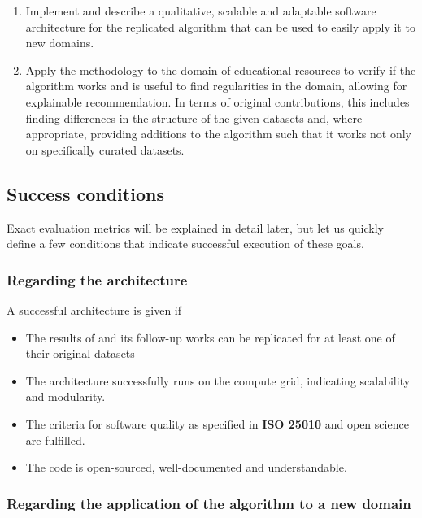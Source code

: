\begin{enumerate}
    \item Implement and describe a qualitative, scalable and adaptable software architecture for the replicated algorithm that can be used to easily apply it to new domains.
    \item Apply the methodology to the domain of educational resources to verify if the algorithm works and is useful to find regularities in the domain, allowing for explainable recommendation. In terms of original contributions, this includes finding differences in the structure of the given datasets and, where appropriate, providing additions to the algorithm such that it works not only on specifically curated datasets.
\end{enumerate}

\subsection{Success conditions}
\label{sec:success_conds}

Exact evaluation metrics will be explained in detail later, but let us quickly define a few conditions that indicate successful execution of these goals.

\subsubsection*{Regarding the architecture}

A successful architecture is given if 

\begin{itemize}
    \item The results of \cite{Derrac2015} and its follow-up works \cite{Ager2018,Alshaikh2020} can be replicated for at least one of their original datasets
    \item The architecture successfully runs on the compute grid, indicating scalability and modularity.
    \item The criteria for software quality as specified in \textbf{ISO 25010} and open science are fulfilled.
    \item The code is open-sourced, well-documented and understandable.
\end{itemize}

\subsubsection*{Regarding the application of the algorithm to a new domain}

